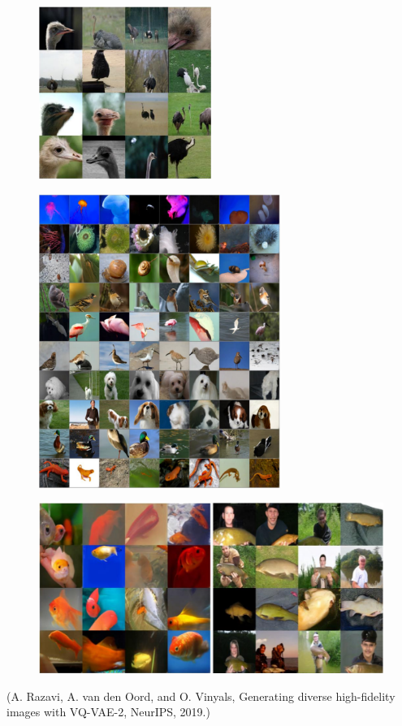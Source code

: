 \begin{concept}[11.24][VQ-VAE-2]
    \begin{figure}[H]
        \centering
        \includegraphics[width=0.5\textwidth]{.././assets/11.10.png}
    \end{figure}

    \begin{figure}[H]
        \centering
        \includegraphics[width=0.7\textwidth]{.././assets/11.11.png}
    \end{figure}

    \begin{figure}[H]
        \centering
        \includegraphics[width=1.0\textwidth]{.././assets/11.12.png}
    \end{figure}

    (A. Razavi, A. van den Oord, and O. Vinyals, Generating diverse high-fidelity images with VQ-VAE-2, NeurIPS, 2019.)
\end{concept}

